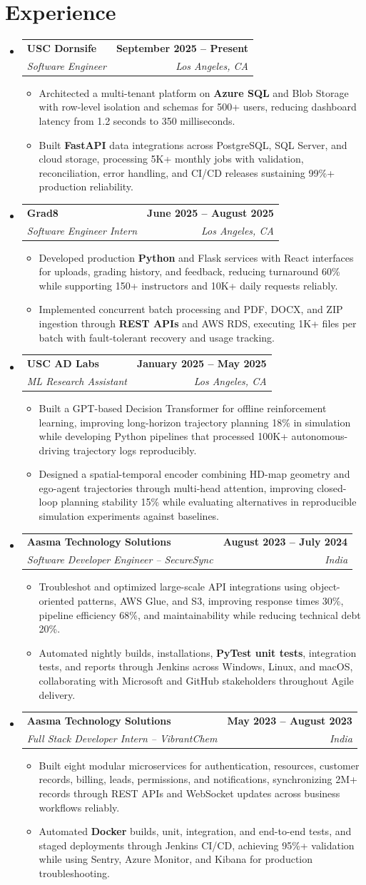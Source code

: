 \documentclass[letterpaper,10pt]{article}
\makeatletter
\newcommand{\itemTail}{\vspace{-4pt}}
\newcommand{\sectionGap}{\vspace{-8pt}}
\newcommand{\roleGap}{\vspace{2pt}}
\newcommand{\resumeItem}[1]{\item\small{{#1 \itemTail}}}
\newcommand{\resumeSubheading}[4]{\vspace{-1pt}\item\begin{tabular*}{1.0\textwidth}[t]{l@{\extracolsep{\fill}}r}\textbf{#1} & \textbf{\small #2} \\\textit{\small#3} & \textit{\small #4} \\\end{tabular*}\vspace{-2pt}}
\newcommand{\resumeSubHeadingListStart}{\begin{itemize}[leftmargin=0.0in, label={}]}
\newcommand{\resumeSubHeadingListEnd}{\end{itemize}}
\newcommand{\resumeItemListStart}{\begin{itemize}[leftmargin=0.15in,label=\textbullet,itemsep=3pt,topsep=0pt,parsep=0pt,partopsep=0pt]}
\newcommand{\resumeItemListEnd}{\end{itemize}\vspace{-4pt}}
\makeatother
\begin{document}
\section{Experience}
\resumeSubHeadingListStart
\resumeSubheading{USC Dornsife}{September 2025 -- Present}{Software Engineer}{Los Angeles, CA}
\resumeItemListStart
\resumeItem{Architected a multi-tenant platform on \textbf{Azure SQL} and Blob Storage with row-level isolation and schemas for 500+ users, reducing dashboard latency from 1.2 seconds to 350 milliseconds.}
\resumeItem{Built \textbf{FastAPI} data integrations across PostgreSQL, SQL Server, and cloud storage, processing 5K+ monthly jobs with validation, reconciliation, error handling, and CI/CD releases sustaining 99\%+ production reliability.}
\resumeItemListEnd
\roleGap
\resumeSubheading{Grad8}{June 2025 -- August 2025}{Software Engineer Intern}{Los Angeles, CA}
\resumeItemListStart
\resumeItem{Developed production \textbf{Python} and Flask services with React interfaces for uploads, grading history, and feedback, reducing turnaround 60\% while supporting 150+ instructors and 10K+ daily requests reliably.}
\resumeItem{Implemented concurrent batch processing and PDF, DOCX, and ZIP ingestion through \textbf{REST APIs} and AWS RDS, executing 1K+ files per batch with fault-tolerant recovery and usage tracking.}
\resumeItemListEnd
\roleGap
\resumeSubheading{USC AD Labs}{January 2025 -- May 2025}{ML Research Assistant}{Los Angeles, CA}
\resumeItemListStart
\resumeItem{Built a GPT-based Decision Transformer for offline reinforcement learning, improving long-horizon trajectory planning 18\% in simulation while developing Python pipelines that processed 100K+ autonomous-driving trajectory logs reproducibly.}
\resumeItem{Designed a spatial-temporal encoder combining HD-map geometry and ego-agent trajectories through multi-head attention, improving closed-loop planning stability 15\% while evaluating alternatives in reproducible simulation experiments against baselines.}
\resumeItemListEnd
\roleGap
\resumeSubheading{Aasma Technology Solutions}{August 2023 -- July 2024}{Software Developer Engineer -- SecureSync}{India}
\resumeItemListStart
\resumeItem{Troubleshot and optimized large-scale API integrations using object-oriented patterns, AWS Glue, and S3, improving response times 30\%, pipeline efficiency 68\%, and maintainability while reducing technical debt 20\%.}
\resumeItem{Automated nightly builds, installations, \textbf{PyTest unit tests}, integration tests, and reports through Jenkins across Windows, Linux, and macOS, collaborating with Microsoft and GitHub stakeholders throughout Agile delivery.}
\resumeItemListEnd
\roleGap
\resumeSubheading{Aasma Technology Solutions}{May 2023 -- August 2023}{Full Stack Developer Intern -- VibrantChem}{India}
\resumeItemListStart
\resumeItem{Built eight modular microservices for authentication, resources, customer records, billing, leads, permissions, and notifications, synchronizing 2M+ records through REST APIs and WebSocket updates across business workflows reliably.}
\resumeItem{Automated \textbf{Docker} builds, unit, integration, and end-to-end tests, and staged deployments through Jenkins CI/CD, achieving 95\%+ validation while using Sentry, Azure Monitor, and Kibana for production troubleshooting.}
\resumeItemListEnd
\resumeSubHeadingListEnd
\sectionGap
\end{document}
